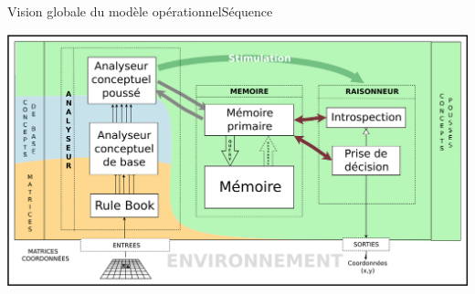 \begin{frame}{Vision globale du modèle opérationnel}{Séquence}
\begin{center}
	\includegraphics[width=\textwidth]{img/diags/simplified_general_diagram}\\
\end{center}
\end{frame}
